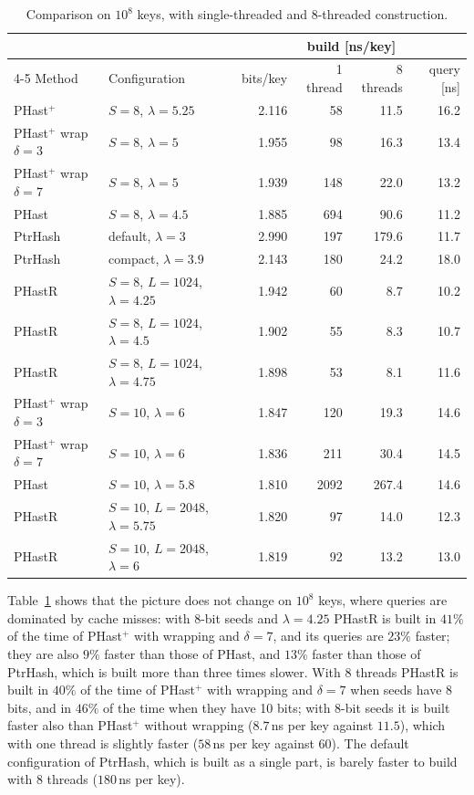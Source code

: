 \documentclass[11pt]{article}
\newcommand{\PHast}{PHast\xspace}
\newcommand{\PHastP}{PHast$^+$\xspace}
\newcommand{\PHastR}{PHastR\xspace}
\begin{document}
\begin{table}[t]
\centering
\caption{Comparison on $10^8$ keys, with single-threaded and 8-threaded
construction.}
\label{tab:1e8}
\small
\begin{tabular}{llrrrr}
\toprule
& & & \multicolumn{2}{c}{build [ns/key]} & \\
\cmidrule(lr){4-5}
Method & Configuration & bits/key & 1 thread & 8 threads & query [ns] \\
\midrule
\PHastP & $S=8$, $\lambda=5.25$ & 2.116 & 58 & 11.5 & 16.2 \\
\PHastP wrap $\delta=3$ & $S=8$, $\lambda=5$ & 1.955 & 98 & 16.3 & 13.4 \\
\PHastP wrap $\delta=7$ & $S=8$, $\lambda=5$ & 1.939 & 148 & 22.0 & 13.2 \\
\PHast & $S=8$, $\lambda=4.5$ & 1.885 & 694 & 90.6 & 11.2 \\
PtrHash & default, $\lambda=3$ & 2.990 & 197 & 179.6 & 11.7 \\
PtrHash & compact, $\lambda=3.9$ & 2.143 & 180 & 24.2 & 18.0 \\
\addlinespace
\PHastR & $S=8$, $L=1024$, $\lambda=4.25$ & 1.942 & 60 & 8.7 & 10.2 \\
\PHastR & $S=8$, $L=1024$, $\lambda=4.5$ & 1.902 & 55 & 8.3 & 10.7 \\
\PHastR & $S=8$, $L=1024$, $\lambda=4.75$ & 1.898 & 53 & 8.1 & 11.6 \\
\midrule
\PHastP wrap $\delta=3$ & $S=10$, $\lambda=6$ & 1.847 & 120 & 19.3 & 14.6 \\
\PHastP wrap $\delta=7$ & $S=10$, $\lambda=6$ & 1.836 & 211 & 30.4 & 14.5 \\
\PHast & $S=10$, $\lambda=5.8$ & 1.810 & 2092 & 267.4 & 14.6 \\
\addlinespace
\PHastR & $S=10$, $L=2048$, $\lambda=5.75$ & 1.820 & 97 & 14.0 & 12.3 \\
\PHastR & $S=10$, $L=2048$, $\lambda=6$ & 1.819 & 92 & 13.2 & 13.0 \\
\bottomrule
\end{tabular}
\end{table}

Table~\ref{tab:1e8} shows that the picture does not change on $10^8$ keys,
where queries are dominated by cache misses: with 8-bit seeds and
$\lambda=4.25$ \PHastR is built in $41\%$ of the time of \PHastP with
wrapping and $\delta=7$, and its queries are $23\%$ faster; they are also
$9\%$ faster than those of \PHast, and $13\%$ faster than those of PtrHash,
which is built more than three times slower. With 8 threads \PHastR is
built in $40\%$ of the time of \PHastP with wrapping and $\delta=7$ when
seeds have 8 bits, and in $46\%$ of the time when they have 10 bits; with
8-bit seeds it is built faster also than \PHastP without wrapping
($8.7$\,ns per key against $11.5$), which with one thread is slightly faster
($58$\,ns per key against $60$). The default configuration of PtrHash, which
is built as a single part, is barely faster to build with 8 threads
($180$\,ns per key).
\end{document}
